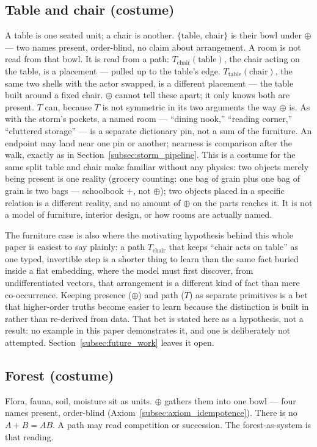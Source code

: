 \documentclass[12pt, a4paper]{article}
\begin{document}
\subsection{Table and chair (costume)}
\label{subsec:table_chair}
A table is one seated unit; a chair is another. $\{\mathrm{table},\,\mathrm{chair}\}$
is their bowl under $\oplus$ --- two names present, order-blind, no
claim about arrangement. A room is not read from that bowl. It is
read from a path: $T_{\mathrm{chair}}(\mathrm{table})$, the chair
acting on the table, is a placement --- pulled up to the table's edge.
$T_{\mathrm{table}}(\mathrm{chair})$, the same two shells with the
actor swapped, is a different placement --- the table built around
a fixed chair. $\oplus$ cannot tell these apart; it only knows both
are present. $T$ can, because $T$ is not symmetric in its two
arguments the way $\oplus$ is. As with the storm's pockets, a named
room --- ``dining nook,'' ``reading corner,'' ``cluttered storage''
--- is a separate dictionary pin, not a sum of the furniture. An
endpoint may land near one pin or another; nearness is comparison
after the walk, exactly as in Section~\ref{subsec:storm_pipeline}.
This is a costume for the same split table and chair make familiar
without any physics: two objects merely being present is one
reality (grocery counting: one bag of grain plus one bag of grain is
two bags --- schoolbook $+$, not $\oplus$); two objects placed
in a specific relation is a different reality, and no amount of
$\oplus$ on the parts reaches it. It is not a model of furniture,
interior design, or how rooms are actually named.

The furniture case is also where the motivating hypothesis behind
this whole paper is easiest to say plainly: a path $T_{\mathrm{chair}}$
that keeps ``chair acts on table'' as one typed, invertible step is a
shorter thing to learn than the same fact buried inside a flat
embedding, where the model must first discover, from undifferentiated
vectors, that arrangement is a different kind of fact than mere
co-occurrence. Keeping presence ($\oplus$) and path ($T$) as separate
primitives is a bet that higher-order truths become easier to learn
because the distinction is built in rather than re-derived from data.
That bet is stated here as a hypothesis, not a result: no example in
this paper demonstrates it, and one is deliberately not attempted.
Section~\ref{subsec:future_work} leaves it open.

\subsection{Forest (costume)}
Flora, fauna, soil, moisture sit as units. $\oplus$ gathers them into
one bowl --- four names present, order-blind
(Axiom~\ref{subsec:axiom_idempotence}).
There is no $A+B=AB$. A path may read competition or succession.
The forest-as-system is that reading.
\end{document}
